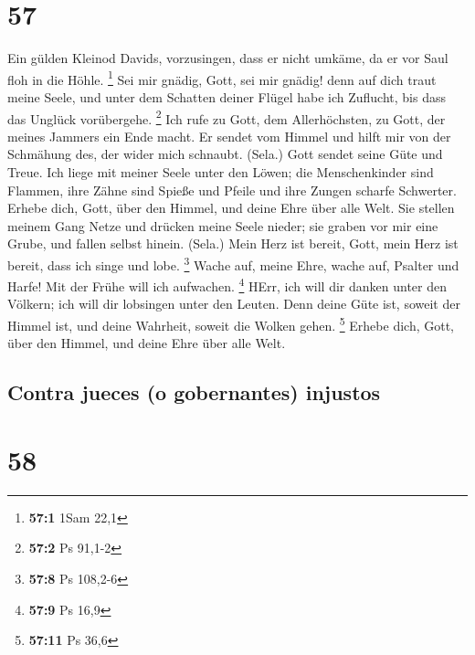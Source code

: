 \hypertarget{section-56}{%
\section{57}\label{section-56}}

 Ein gülden Kleinod Davids, vorzusingen, dass er nicht
umkäme, da er vor Saul floh in die Höhle. \footnote{\textbf{57:1} 1Sam
  22,1}  Sei mir gnädig, Gott, sei mir gnädig! denn auf
dich traut meine Seele, und unter dem Schatten deiner Flügel habe ich
Zuflucht, bis dass das Unglück vorübergehe. \footnote{\textbf{57:2} Ps
  91,1-2}  Ich rufe zu Gott, dem Allerhöchsten, zu Gott,
der meines Jammers ein Ende macht.  Er sendet vom Himmel
und hilft mir von der Schmähung des, der wider mich schnaubt. (Sela.)
Gott sendet seine Güte und Treue.  Ich liege mit meiner
Seele unter den Löwen; die Menschenkinder sind Flammen, ihre Zähne sind
Spieße und Pfeile und ihre Zungen scharfe Schwerter. 
Erhebe dich, Gott, über den Himmel, und deine Ehre über alle Welt.
 Sie stellen meinem Gang Netze und drücken meine Seele
nieder; sie graben vor mir eine Grube, und fallen selbst hinein. (Sela.)
 Mein Herz ist bereit, Gott, mein Herz ist bereit, dass
ich singe und lobe. \footnote{\textbf{57:8} Ps 108,2-6} 
Wache auf, meine Ehre, wache auf, Psalter und Harfe! Mit der Frühe will
ich aufwachen. \footnote{\textbf{57:9} Ps 16,9}  HErr,
ich will dir danken unter den Völkern; ich will dir lobsingen unter den
Leuten.  Denn deine Güte ist, soweit der Himmel ist, und
deine Wahrheit, soweit die Wolken gehen. \footnote{\textbf{57:11} Ps
  36,6}  Erhebe dich, Gott, über den Himmel, und deine
Ehre über alle Welt.

\hypertarget{contra-jueces-o-gobernantes-injustos}{%
\subsection{Contra jueces (o gobernantes)
injustos}\label{contra-jueces-o-gobernantes-injustos}}

\hypertarget{section-57}{%
\section{58}\label{section-57}}

